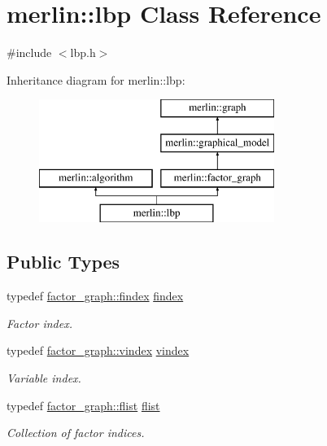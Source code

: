 \hypertarget{classmerlin_1_1lbp}{}\section{merlin\+:\+:lbp Class Reference}
\label{classmerlin_1_1lbp}


{\ttfamily \#include $<$lbp.\+h$>$}

Inheritance diagram for merlin\+:\+:lbp\+:\begin{figure}[H]
\begin{center}
\leavevmode
\includegraphics[height=4.000000cm]{classmerlin_1_1lbp}
\end{center}
\end{figure}
\subsection*{Public Types}
\begin{DoxyCompactItemize}
\item 
typedef \hyperlink{classmerlin_1_1factor__graph_a533556bd4ec6961b63a91a80a8a37508}{factor\+\_\+graph\+::findex} \hyperlink{classmerlin_1_1lbp_ad925905e6ca72cc3801260e7e63b7cae}{findex}\hypertarget{classmerlin_1_1lbp_ad925905e6ca72cc3801260e7e63b7cae}{}\label{classmerlin_1_1lbp_ad925905e6ca72cc3801260e7e63b7cae}

\begin{DoxyCompactList}\small\item\em Factor index. \end{DoxyCompactList}\item 
typedef \hyperlink{classmerlin_1_1factor__graph_a6b8a8220d86d6a6f91a8d2c7dd00ddc9}{factor\+\_\+graph\+::vindex} \hyperlink{classmerlin_1_1lbp_a2830aeb04ade80d6955b65297a59f68a}{vindex}\hypertarget{classmerlin_1_1lbp_a2830aeb04ade80d6955b65297a59f68a}{}\label{classmerlin_1_1lbp_a2830aeb04ade80d6955b65297a59f68a}

\begin{DoxyCompactList}\small\item\em Variable index. \end{DoxyCompactList}\item 
typedef \hyperlink{classmerlin_1_1factor__graph_a48dec4ea8a655315053984a81fe93ebc}{factor\+\_\+graph\+::flist} \hyperlink{classmerlin_1_1lbp_aefcbe2afa6efb09b12788e83cd7460f5}{flist}\hypertarget{classmerlin_1_1lbp_aefcbe2afa6efb09b12788e83cd7460f5}{}\label{classmerlin_1_1lbp_aefcbe2afa6efb09b12788e83cd7460f5}

\begin{DoxyCompactList}\small\item\em Collection of factor indices. \end{DoxyCompactList}\end{DoxyCompactItemize}
